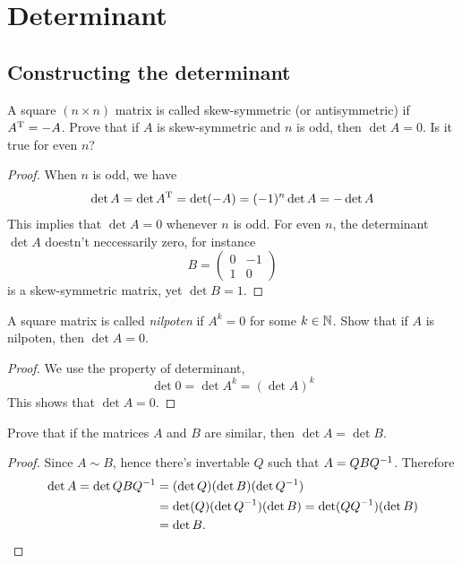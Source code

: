 


\renewcommand{\thesection}{\arabic{section}.}
\renewcommand{\theexercise}{\arabic{section}.\arabic{exercise}}



\setcounter{chapter}{2}
\chapter{Determinant}

\setcounter{section}{2}
\section{Constructing the determinant}
\setcounter{exercise}{3}
\begin{exercise}
  A square $(n\times n)$ matrix is called skew-symmetric 
  (or antisymmetric) if $A^\mathrm{T} = -A$. Prove that if $A$ is 
  skew-symmetric and $n$ is odd, then $\det A=0$. Is it
  true for even $n$?
\end{exercise}
\begin{proof}
  When $n$ is odd, we have
  \begin{align*}
    \det A=\det A^\mathrm{T}=\det (-A)=(-1)^n\det A=-\det A
  \end{align*}
  This implies that $\det A=0$ whenever $n$ is odd. For even $n$,
  the determinant $\det A$ doestn't neccessarily zero, for instance
  \[ B=\begin{pmatrix} 0&-1\\1&0 \end{pmatrix} \]
  is a skew-symmetric matrix, yet $\det B=1$.
\end{proof}
\begin{exercise}
  A square matrix is called \emph{nilpoten} if $A^k=0$
  for some $k\in\mathbb N$. Show that if $A$ is nilpoten, then
  $\det A=0$.
\end{exercise}
\begin{proof}
  We use the property of determinant,
  \[ \det 0=\det A^k=(\det A)^k \]
  This shows that $\det A=0$.
\end{proof}
\begin{exercise}
  Prove that if the matrices $A$ and $B$ are similar,
  then $\det A=\det B$.
\end{exercise}
\begin{proof}
  Since $A\sim B$, hence there's invertable $Q$ such that
  $A=QBQ^{-1}$. Therefore
  \begin{align*}
    \det A=\det QBQ^{-1}
    &=(\det Q)(\det B)(\det Q^{-1})\\
    &=\det(Q)(\det Q^{-1})(\det B)=\det(QQ^{-1})(\det B)\\
    &=\det B.
  \end{align*}
\end{proof}
